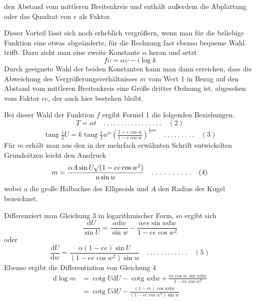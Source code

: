 %
den Abstand vom mittleren Breitenkreis und enthält außerdem die Abplattung oder das Quadrat von \(e\) als Faktor.

Dieser Vorteil lässt sich noch erheblich vergrößern, wenn man für die beliebige Funktion eine etwas abgeänderte, für die Rechnung fast ebenso bequeme Wahl trifft. Dazu zieht man eine zweite Konstante \(\alpha\) heran und setzt
\[
f\upsilon=\alpha\upsilon-i\log k
\]
Durch geeignete Wahl der beiden Konstanten kann man dann erreichen, dass die Abweichung des Vergrößerungsverhältnisses \(m\) vom Wert 1 in Bezug auf den Abstand vom mittleren Breitenkreis eine Größe dritter Ordnung ist, abgesehen vom Faktor \(ee\), der auch hier bestehen bleibt.

\indent Bei dieser Wahl der Funktion \(f\) ergibt Formel 1 die folgenden Beziehungen.
\[
T=\alpha t \quad .\ .\ .\ .\ .\ .\ .\ .\ .\ .\ .\ .\ .\ .\ .\ .\ .\quad(2)
\]
\[
\operatorname{tang}\tfrac{1}{2}U=k\operatorname{tang}\tfrac{1}{2}w^\alpha(\tfrac{1+e\cos w}{1-e\cos w})^{\frac{1}{2}\alpha e} \quad .\ .\ .\ .\ .\ .\ .\ .\ .\quad(3)
\]
Für \(m\) erhält man aus den in der mehrfach erwähnten Schrift entwickelten Grundsätzen leicht den Ausdruck
\[
m=\frac{\alpha A\sin U\mathord{{}^{}\!\surd}(1-ee\cos w^2)}{a\sin w} \quad .\ .\ .\ .\ .\ .\ .\ .\ .\ .\quad(4)
\]
wobei \(a\) die große Halbachse des Ellipsoids und \(A\) den Radius der Kugel bezeichnet.

Differenziert man Gleichung 3 in logarithmischer Form, so ergibt sich
\[
\frac{\mathrm{d}U}{\sin U}=\frac{\alpha\mathrm{d}w}{\sin w}-\frac{\alpha ee\sin w\mathrm{d}w}{1-ee\cos w^2}
\]
oder
\[
\frac{\mathrm{d}U}{\mathrm{d}w}=\frac{\alpha(1-ee)\sin U}{(1-ee\cos w^2)\sin w} \quad .\ .\ .\ .\ .\ .\ .\ .\ .\ .\ .\ .\quad(5)
\]
Ebenso ergibt die Differentiation von Gleichung 4
\[
\begin{aligned}
\mathrm{d}\log m&=\operatorname{cotg}U\mathrm{d}U-\operatorname{cotg}w\mathrm{d}w+\frac{ee\cos w\mathord{.}\sin w\mathrm{d}w}{1-ee\cos w^2}\\
&=\operatorname{cotg}U\mathrm{d}U-\frac{(1-ee)\cos w\mathrm{d}w}{(1-ee\cos w^2)\sin w}
\end{aligned}
\]
